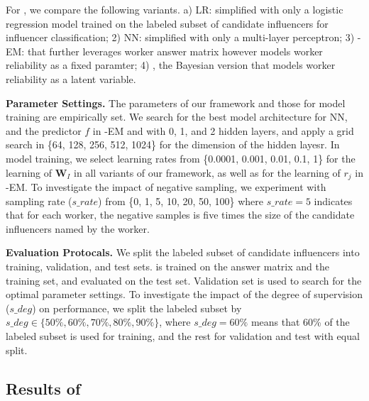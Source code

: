 For \sys, we compare the following variants. a) LR: simplified \sys with only a logistic regression model trained on the labeled subset of candidate influencers for influencer classification; 2) NN: simplified \sys with only a multi-layer perceptron; 3) \sys-EM: \sys that further leverages worker answer matrix however models worker reliability as a fixed paramter; 4) \sys, the Bayesian version that models worker reliability as a latent variable.

\smallskip
\noindent\textbf{Parameter Settings.} The parameters of our framework and those for model training are empirically set. We search for the best model architecture for NN, and the predictor $f$ in \sys-EM and \sys with 0, 1, and 2 hidden layers, and apply a grid search in \{64, 128, 256, 512, 1024\} for the dimension of the hidden layesr. In model training, we select learning rates from \{0.0001, 0.001, 0.01, 0.1, 1\} for the learning of $\mathbf{W}_I$ in all variants of our framework, as well as for the learning of $r_j$ in \sys-EM. To investigate the impact of negative sampling, we experiment with sampling rate ($s\_rate$) from \{0, 1, 5, 10, 20, 50, 100\} where $s\_rate=5$ indicates that for each worker, the negative samples is five times the size of the candidate influencers named by the worker. 

\smallskip
\noindent\textbf{Evaluation Protocals.} We split the labeled subset of candidate influencers into training, validation, and test sets. \sys is trained on the answer matrix and the training set, and evaluated on the test set. Validation set is used to search for the optimal parameter settings. To investigate the impact of the degree of supervision ($s\_deg$) on \sys performance, we split the labeled subset by $s\_deg\in \{50\%, 60\%, 70\%, 80\%, 90\%\}$, where $s\_deg = 60\%$ means that 60\% of the labeled subset is used for training, and the rest for validation and test with equal split.



\subsection{Results of \sys}
\label{sec:selfres}

